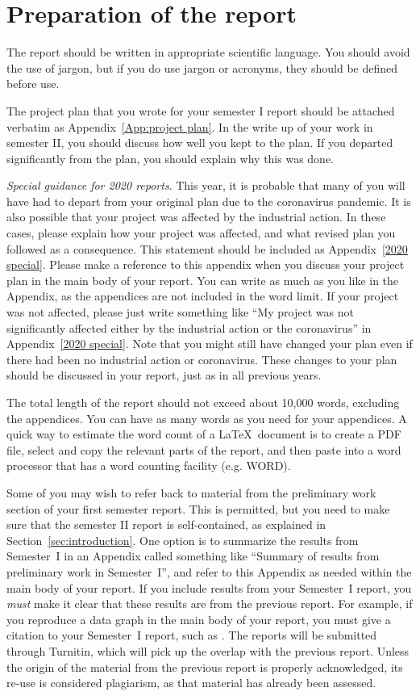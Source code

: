 \documentclass[a4paper,fleqn,usenatbib]{mnras}
\begin{document}
\section{Preparation of the report}
The report should be written in appropriate scientific language. You should avoid the use of jargon, but if you do use jargon or acronyms, they should be defined before use.  

The project plan that you wrote for your semester I report should be attached verbatim as Appendix~\ref{App:project plan}. In the write up of your work in semester II, you should discuss how well you kept to the plan. If you departed significantly from the plan, you should explain why this was done.

\textit{Special guidance for 2020 reports}. This year, it is probable that many of you will have had to depart from your original plan due to the coronavirus pandemic. It is also possible that your project was affected by the industrial action. In these cases, please explain how your project was affected, and what revised plan you followed as a consequence. This statement should be included as Appendix~\ref{2020 special}. Please make a reference to this appendix when you discuss your project plan in the main body of your report. You can write as much as you like in the Appendix, as the appendices are not included in the word limit. 
If your project was not affected, please just write something like ``My project was not significantly affected either by the industrial action or the coronavirus'' in Appendix~\ref{2020 special}. Note that you might still have changed your plan even if there had been no industrial action or coronavirus. These changes to your plan should be discussed in your report, just as in all previous years.

 
The total length of the report should not exceed about 10,000 words, excluding the appendices. You can have as many words as you need for your appendices. A quick way to estimate the word count of a \LaTeX\ document is to create a PDF file, select and copy the relevant parts  of the report, and then paste into a word processor that has a word counting facility (e.g. WORD).

Some of you may wish to refer back to material from the preliminary work section of your first semester report. This is permitted, but you need to make sure that the semester II report is self-contained, as explained in Section~\ref{sec:introduction}. One option is to summarize the results from Semester~I in an Appendix called something like ``Summary of results from preliminary work in Semester~I'', and refer to this Appendix as needed within the main body of your report. If you include results from your Semester~I report, you \textit{must} make it clear that these results are from the previous report. For example, if you reproduce a data graph in the main body of your report, you must give a citation to your Semester~I report, such as \citep{semester 1 report}. The reports will be submitted through Turnitin, which will pick up the overlap with the previous report. Unless the origin of the material from the previous report is properly acknowledged, its re-use is considered plagiarism, as that material has already been assessed.
\end{document}
